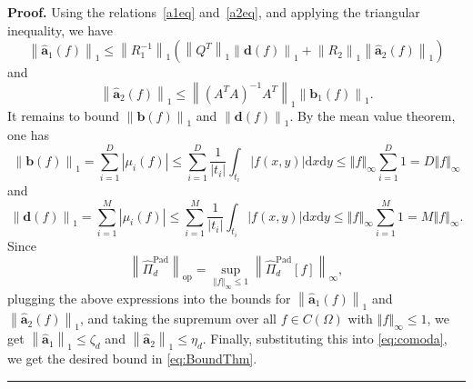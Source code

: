 \documentclass[10pt,a4paper]{amsart}
\newcommand{\de}{\mathrm{d}}
\newenvironment{proof}[1][Proof]{\noindent\textbf{#1.} }{\ \rule{0.5em}{0.5em}}
\begin{document}
\begin{proof}
Using the relations~\eqref{a1eq} and~\eqref{a2eq}, and applying the triangular inequality, we have
\begin{equation*}
    \left\lVert \hat{\boldsymbol{a}}_1 (f) \right\rVert_1\le \left\lVert R_{1}^{-1}\right\rVert_{1} \left(\left\lVert Q^T \right\rVert_1 \left\lVert \boldsymbol{d} (f) \right\rVert_1 + \left\lVert R_{2}\right\rVert_1 \left\lVert \hat{\boldsymbol{a}}_2 (f)\right\rVert_1\right) 
\end{equation*}
and
\begin{equation*}\label{a2}
   \left\lVert \hat{\boldsymbol{a}}_2 (f)\right\rVert_1\le\left\lVert\left(A^{T}A\right)^{-1}A^{T}\right\rVert_1 \left\lVert \boldsymbol{b}_1 (f) \right\rVert_1.
\end{equation*}
It remains to bound $\left\lVert \boldsymbol{b} (f) \right\rVert_1$ and $\left\lVert \boldsymbol{d} (f) \right\rVert_1$. By the mean value theorem, %
one has
\begin{equation*}\label{aus1}
    \left\lVert \boldsymbol{b} (f) \right\rVert_1=\sum_{i=1}^D \left\lvert \mu_i(f)\right\rvert\le\sum_{i=1} ^D \frac{1}{|t_i|}\int_{t_i}\left\lvert f(x,y)\right\rvert \de x \de y \le \left\Vert f \right\Vert_\infty \sum_{i=1} ^D 1 = D \left\Vert f \right\Vert_\infty
\end{equation*}
and 
\begin{equation*}
\left\lVert \boldsymbol{d} (f) \right\rVert_1=\sum_{i=1}^{M} \left\lvert \mu_i(f)\right\rvert\le \sum_{i=1}^M \frac{1}{|t_i|} \int_{t_i}\left\lvert f(x,y)\right\rvert \de x \de y \le \left\Vert f \right\Vert_\infty \sum_{i=1} ^{M} 1 = M \left\Vert f \right\Vert_\infty.
\end{equation*}
Since
\begin{equation*}
    \left\lVert \hat{\Pi}_d^{\mathrm{Pad}} \right\rVert_{\mathrm{op}} = \sup_{\left\Vert f \right\Vert_\infty \leq 1} \left\lVert \hat{\Pi}_d^{\mathrm{Pad}} [f] \right\rVert_\infty, 
\end{equation*}
plugging the above expressions into the bounds for $ \left\lVert \hat{\boldsymbol{a}}_1 (f) \right\rVert_1 $ and $ \left\lVert \hat{\boldsymbol{a}}_2 (f) \right\rVert_1 $, and taking the supremum over all $f \in C(\Omega)$ with $ \left\Vert f \right\Vert_\infty \leq 1 $, we get $ \left\lVert \hat{\boldsymbol{a}}_1 \right\rVert_1 \leq \zeta_d $ and $ \left\lVert \hat{\boldsymbol{a}}_2\right\rVert_1 \leq \eta_d $. Finally, substituting this into \eqref{eq:comoda}, we get the desired bound in \eqref{eq:BoundThm}.
\end{proof}
\end{document}
